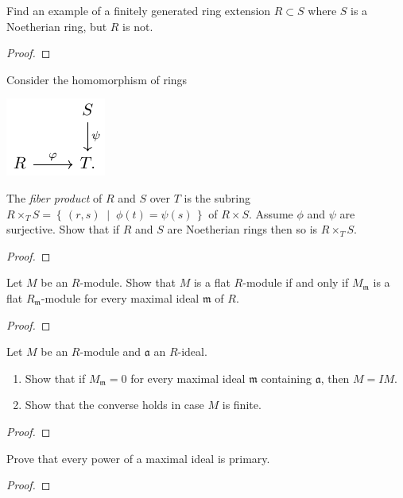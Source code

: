 \begin{problem}
Find an example of a finitely generated ring extension $R\subset
S$ where $S$ is a Noetherian ring, but $R$ is not.
\end{problem}
\begin{proof}

\end{proof}
\newpage
\begin{problem}
Consider the homomorphism of rings
\begin{center}
\includegraphics{figures/hw-4-ring-maps}
\end{center}
The \emph{fiber product} of $R$ and $S$ over $T$ is the subring
$R\times_T S=\left\{\,(r,s)\;\middle|\;\phi(t)=\psi(s)\,\right\}$
of $R\times S$. Assume $\phi$ and $\psi$ are surjective. Show
that if $R$ and $S$ are Noetherian rings then so is $R\times_T
S$.
\end{problem}
\begin{proof}
\end{proof}
\newpage
\begin{problem}
Let $M$ be an $R$-module. Show that $M$ is a flat $R$-module if
and only if $M_{\mathfrak{m}}$ is a flat
$R_{\mathfrak{m}}$-module for every maximal ideal $\mathfrak{m}$
of $R$.
\end{problem}
\begin{proof}
\end{proof}
\newpage
\begin{problem}
Let $M$ be an $R$-module and $\mathfrak{a}$ an $R$-ideal.
\begin{enumerate}[noitemsep,label=(\alph*)]
\item Show that if $M_{\mathfrak{m}}=0$ for every maximal ideal
  $\mathfrak{m}$ containing $\mathfrak{a}$, then $M=IM$.
\item Show that the converse holds in case $M$ is finite.
\end{enumerate}
\end{problem}
\begin{proof}
\end{proof}
\newpage
\begin{problem}
Prove that every power of a maximal ideal is primary.
\end{problem}
\begin{proof}
\end{proof}
